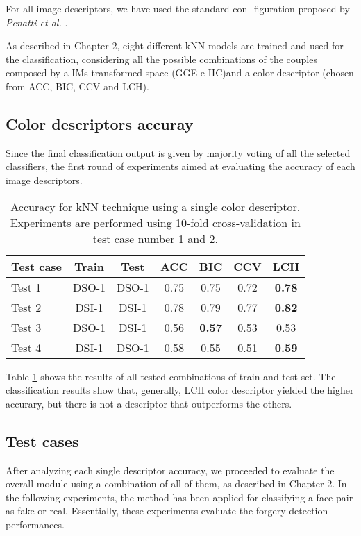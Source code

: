 For all image descriptors, we have used the standard con- figuration proposed by \emph{Penatti et al.} \cite{penatti2012comparative}.

As described in Chapter 2, eight different kNN models are trained and used for the classification, considering all the possible combinations of the couples composed by a IMs transformed space (GGE e IIC)and a color descriptor (chosen from ACC, BIC, CCV and LCH).

\subsection{Color descriptors accuray}

Since the final classification output is given by majority voting of all the selected classifiers, the first round of experiments aimed at evaluating the accuracy of each image descriptors.

\begin{table}[h!]
\centering
\begin{tabular}{l c c c c c c} 
\hline \hline 
\textbf{Test case} & \textbf{Train} & \textbf{Test} & \textbf{ACC} & \textbf{BIC} & \textbf{CCV} & \textbf{LCH} \\ [0.5ex]
\hline
Test 1 & DSO-1 & DSO-1 &	0.75 & 0.75	& 0.72 & \textbf{0.78}\\
Test 2 & DSI-1 & DSI-1 &	0.78 & 0.79 & 0.77 & \textbf{0.82}\\
Test 3 &	DSO-1 &	DSI-1 &	0.56 & \textbf{0.57} & 0.53 & 0.53\\
Test 4 &	DSI-1 & DSO-1 & 0.58 & 0.55 & 0.51 & \textbf{0.59}\\ [1ex]
\hline
\end{tabular}
\caption{Accuracy for kNN technique using a single color descriptor. Experiments are performed using 10-fold cross-validation in test case number 1 and 2.}
\label{table:colordescriptorperformance}
\end{table}

Table \ref{table:colordescriptorperformance} shows the results of all tested combinations of train and test set. The classification results show that, generally, LCH color descriptor yielded the higher accurary, but there is not a descriptor that outperforms the others.

\subsection{Test cases}

After analyzing each single descriptor accuracy, we proceeded to evaluate the overall module using a combination of all of them, as described in Chapter 2. In the following experiments, the  method has been applied for classifying a face pair as fake or real. Essentially, these experiments evaluate the forgery detection performances.


